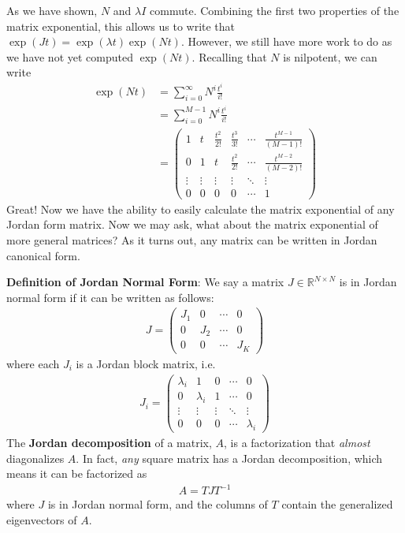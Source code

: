 \documentclass[a4paper,11pt]{exam}
\newcounter{ct}
\newcommand{\field}[1]{\ensuremath{\mathbb{#1}}}
\newcommand{\reals}{\field{R}}
\begin{document}
\begin{questions}
As we have shown, $N$ and $\lambda I$ commute.  Combining the first two properties of the matrix exponential, this allows us to write that $    \exp(J t) = \exp(\lambda t) \exp(N t)$.  However, we still have more work to do as we have not yet computed $\exp(Nt)$.  Recalling that $N$ is nilpotent, we can write
\begin{align}
    \exp(Nt) &= \sum_{i=0}^{\infty} N^i \frac{t^i}{i!}\\
    &= \sum_{i=0}^{M-1} N^i \frac{t^i}{i!}\\
    &= \begin{pmatrix} 1 & t & \frac{t^2}{2!} & \frac{t^3}{3!} & \cdots & \frac{t^{M-1}}{(M-1)!}\\
        0 & 1 & t & \frac{t^2}{2!} & \cdots & \frac{t^{M-2}}{(M-2)!}\\
        \vdots & \vdots & \vdots & \vdots & \ddots & \vdots\\
        0 & 0 & 0 & 0 & \cdots & 1
    \end{pmatrix}
\end{align}
Great! Now we have the ability to easily calculate the matrix exponential of any Jordan form matrix.  Now we may ask, what about the matrix exponential of more general matrices? As it turns out, any matrix can be written in Jordan canonical form.
\begin{tcolorbox}[colback=black!1!,title=Jordan normal form]
    \textbf{Definition of Jordan Normal Form}: We say a matrix $J \in \reals^{N \times N}$ is in Jordan normal form if it can be written as follows:
    \begin{align}
        J = \begin{pmatrix} J_1 & 0 & \cdots & 0\\
        0 & J_2 & \cdots & 0\\
        0 & 0 & \cdots & J_K\end{pmatrix}
    \end{align}
    where each $J_i$ is a Jordan block matrix, i.e.
    \begin{align}
        J_i = \begin{pmatrix} \lambda_i & 1 & 0 & \cdots & 0\\
            0 & \lambda_i & 1 & \cdots & 0\\
            \vdots & \vdots & \vdots & \ddots & \vdots\\
            0 & 0 & 0 & \cdots & \lambda_i
        \end{pmatrix}
    \end{align}
    The \textbf{Jordan decomposition} of a matrix, $A$, is a factorization that \textit{almost} diagonalizes $A$.  In fact, \textit{any} square matrix has a Jordan decomposition, which means it can be factorized as
    \begin{align}
        A = T J T^{-1}
    \end{align}
    where $J$ is in Jordan normal form, and the columns of $T$ contain the generalized eigenvectors of $A$.
\end{tcolorbox}

\end{questions}
\end{document}
